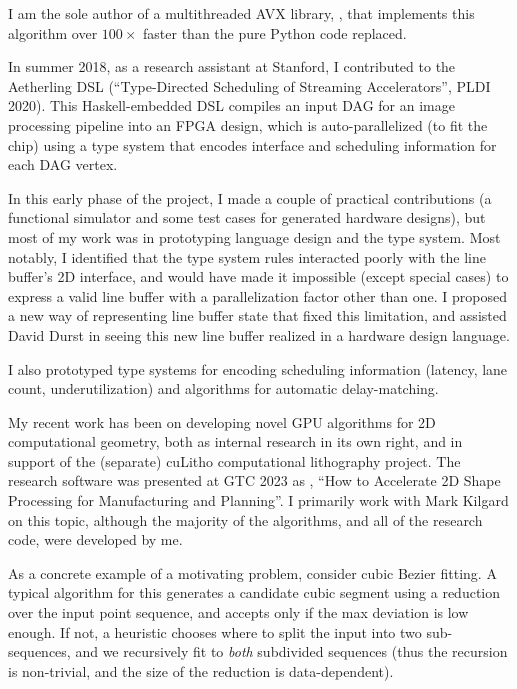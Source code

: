 I am the sole author of a multithreaded AVX
library, ,
that implements this algorithm over $100\times$ faster than the pure
Python code replaced.

In summer 2018, as a research assistant at Stanford, I contributed to
the Aetherling DSL (``Type-Directed Scheduling of Streaming
Accelerators'', PLDI 2020). This Haskell-embedded DSL compiles an
input DAG for an image processing pipeline into an FPGA design, which
is auto-parallelized (to fit the chip) using a type system that
encodes interface and scheduling information for each DAG vertex.

In this early phase of the project, I made a couple of practical
contributions (a functional simulator and some test cases for
generated hardware designs), but most of my work was in prototyping
language design and the type system.  Most notably, I identified that
the type system rules interacted poorly with the line buffer's 2D
interface, and would have made it impossible (except special cases) to
express a valid line buffer with a parallelization factor other than
one. I proposed a new way of representing line buffer state that fixed
this limitation, and assisted David Durst in seeing this new line
buffer realized in a hardware design language.

I also prototyped type systems for encoding scheduling information
(latency, lane count, underutilization) and algorithms for automatic
delay-matching.

\filbreak

My recent work has been on developing novel GPU algorithms for 2D
computational geometry, both as internal research in its own right,
and in support of the (separate) cuLitho computational lithography
project. The research software was presented at GTC 2023 as
, ``How to Accelerate 2D Shape Processing for Manufacturing and
Planning''. I primarily work with Mark Kilgard on this topic, although
the majority of the algorithms, and all of the research code, were
developed by me.

As a concrete example of a motivating problem, consider cubic Bezier
fitting. A typical algorithm for this generates a candidate cubic
segment using a reduction over the input point sequence, and accepts
only if the max deviation is low enough. If not, a heuristic chooses
where to split the input into two sub-sequences, and we recursively
fit to \textit{both} subdivided sequences (thus the recursion is
non-trivial, and the size of the reduction is data-dependent).

